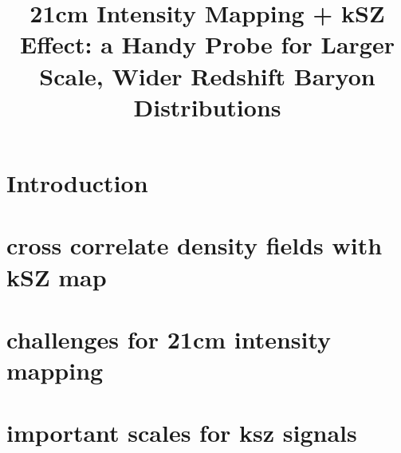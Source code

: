 \documentclass[aps,prd,twocolumn,showpacs,superscriptaddress,groupedaddress,nofootinbib]{revtex4}  %
\begin{document}
\widetext

\title{21cm Intensity Mapping + kSZ Effect: 
a Handy Probe for Larger Scale, Wider Redshift Baryon Distributions}


\pacs{}
\maketitle

\section{Introduction}

\section{cross correlate density fields with kSZ map}

\section{challenges for 21cm intensity mapping}

\section{important scales for ksz signals}

%
%
\end{document}
